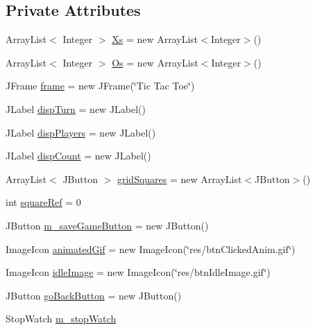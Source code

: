 \subsection*{Private Attributes}
\begin{DoxyCompactItemize}
\item 
Array\+List$<$ Integer $>$ \hyperlink{class_display_1_1_display_t_t_t_a7dc4fccda99b958bd1dead1dc6543442}{Xs} = new Array\+List$<$Integer$>$()
\item 
Array\+List$<$ Integer $>$ \hyperlink{class_display_1_1_display_t_t_t_a06c277ab266ff9c323c13e1fd50299d2}{Os} = new Array\+List$<$Integer$>$()
\item 
J\+Frame \hyperlink{class_display_1_1_display_t_t_t_ab4d0cb92c4459675e8abd22f8ad4161f}{frame} = new J\+Frame(\char`\"{}Tic Tac Toe\char`\"{})
\item 
J\+Label \hyperlink{class_display_1_1_display_t_t_t_a22f3ef7e7b2123a2b900bc8511bdd474}{disp\+Turn} = new J\+Label()
\item 
J\+Label \hyperlink{class_display_1_1_display_t_t_t_a2f2eeba39f4aa0dcc00ef6b72e2b6c66}{disp\+Players} = new J\+Label()
\item 
J\+Label \hyperlink{class_display_1_1_display_t_t_t_afbec846dfebaa4c2640cd270ec21c8b9}{disp\+Count} = new J\+Label()
\item 
Array\+List$<$ J\+Button $>$ \hyperlink{class_display_1_1_display_t_t_t_af2ce89b88ce5f8ccae426f4f273d52aa}{grid\+Squares} = new Array\+List$<$J\+Button$>$()
\item 
int \hyperlink{class_display_1_1_display_t_t_t_a72b67bc50aa6ba47ae9d398e597c49bb}{square\+Ref} = 0
\item 
J\+Button \hyperlink{class_display_1_1_display_t_t_t_afbd113d4a9cd8573238108344561f62c}{m\+\_\+save\+Game\+Button} = new J\+Button()
\item 
Image\+Icon \hyperlink{class_display_1_1_display_t_t_t_a6ff178cba82943d451e39c7c6b577f83}{animated\+Gif} = new Image\+Icon(\char`\"{}res/btn\+Clicked\+Anim.\+gif\char`\"{})
\item 
Image\+Icon \hyperlink{class_display_1_1_display_t_t_t_a9f22db838fa2492c00c8466efb8eebd5}{idle\+Image} = new Image\+Icon(\char`\"{}res/btn\+Idle\+Image.\+gif\char`\"{})
\item 
J\+Button \hyperlink{class_display_1_1_display_t_t_t_a25d9abae3eed1579b8c8a59f7d0450fa}{go\+Back\+Button} = new J\+Button()
\item 
Stop\+Watch \hyperlink{class_display_1_1_display_t_t_t_ab640a3b08cb9f98d5a9481e45653b49f}{m\+\_\+stop\+Watch}

\end{DoxyCompactItemize}
